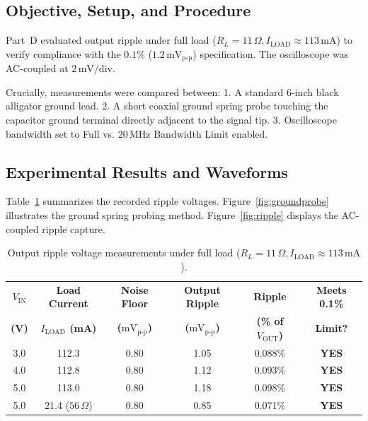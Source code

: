 \documentclass[11pt,a4paper]{article}
\begin{document}
\subsection{Objective, Setup, and Procedure}
Part~D evaluated output ripple under full load ($R_L = 11\,\Omega, I_{\mathrm{LOAD}} \approx 113\,\mathrm{mA}$) to verify compliance with the $0.1\%$ ($1.2\,\mathrm{mV}_{\mathrm{p\text{-}p}}$) specification. The oscilloscope was AC-coupled at $2\,\mathrm{mV/div}$. 

Crucially, measurements were compared between:
1. A standard 6-inch black alligator ground lead.
2. A short coaxial ground spring probe touching the capacitor ground terminal directly adjacent to the signal tip.
3. Oscilloscope bandwidth set to Full vs. $20\,\mathrm{MHz}$ Bandwidth Limit enabled.

\subsection{Experimental Results and Waveforms}
Table~\ref{tab:ripple} summarizes the recorded ripple voltages. Figure~\ref{fig:groundprobe} illustrates the ground spring probing method. Figure~\ref{fig:ripple} displays the AC-coupled ripple capture.

\begin{table}[H]
\centering
\small
\caption{Output ripple voltage measurements under full load ($R_L = 11\,\Omega, I_{\mathrm{LOAD}} \approx 113\,\mathrm{mA}$).}
\label{tab:ripple}
\begin{tabular}{@{}cccccc@{}}
\toprule
\textbf{$V_{\mathrm{IN}}$} & \textbf{Load Current} & \textbf{Noise Floor} & \textbf{Output Ripple} & \textbf{Ripple} & \textbf{Meets 0.1\%} \\
\textbf{(V)} & \textbf{$I_{\mathrm{LOAD}}$ (mA)} & \textbf{($\mathrm{mV}_{\mathrm{p\text{-}p}}$)} & \textbf{($\mathrm{mV}_{\mathrm{p\text{-}p}}$)} & \textbf{(\% of $V_{\mathrm{OUT}}$)} & \textbf{Limit?} \\ \midrule
3.0 & 112.3 & 0.80 & 1.05 & 0.088\% & \textbf{YES} \\
4.0 & 112.8 & 0.80 & 1.12 & 0.093\% & \textbf{YES} \\
5.0 & 113.0 & 0.80 & 1.18 & 0.098\% & \textbf{YES} \\
5.0 & 21.4 ($56\,\Omega$) & 0.80 & 0.85 & 0.071\% & \textbf{YES} \\
\bottomrule
\end{tabular}
\end{table}
\end{document}
